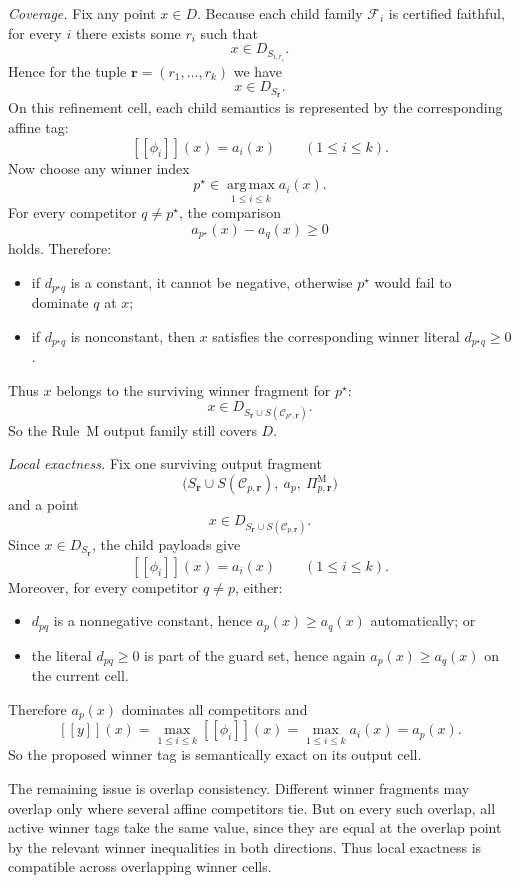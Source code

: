 \emph{Coverage.}
Fix any point $x\in D$. Because each child family $\mathcal F_i$ is certified faithful, for every $i$ there exists some $r_i$ such that
\[
 x\in D_{S_{i,r_i}}.
\]
Hence for the tuple $\mathbf r=(r_1,\dots,r_k)$ we have
\[
 x\in D_{S_{\mathbf r}}.
\]
On this refinement cell, each child semantics is represented by the corresponding affine tag:
\[
 [[\phi_i]](x)=a_i(x)
 \qquad (1\le i\le k).
\]
Now choose any winner index
\[
 p^\star\in \operatorname*{arg\,max}_{1\le i\le k} a_i(x).
\]
For every competitor $q\neq p^\star$, the comparison
\[
 a_{p^\star}(x)-a_q(x)\ge 0
\]
holds. Therefore:
\begin{itemize}
    \item if $d_{p^\star q}$ is a constant, it cannot be negative, otherwise $p^\star$ would fail to dominate $q$ at $x$;
    \item if $d_{p^\star q}$ is nonconstant, then $x$ satisfies the corresponding winner literal $d_{p^\star q}\ge 0$.
\end{itemize}
Thus $x$ belongs to the surviving winner fragment for $p^\star$:
\[
 x\in D_{S_{\mathbf r}\cup S(\mathcal C_{p^\star,\mathbf r})}.
\]
So the Rule~M output family still covers $D$.

\emph{Local exactness.}
Fix one surviving output fragment
\[
 \bigl(S_{\mathbf r}\cup S(\mathcal C_{p,\mathbf r}),\ a_p,\ \Pi_{p,\mathbf r}^{\mathrm M}\bigr)
\]
and a point
\[
 x\in D_{S_{\mathbf r}\cup S(\mathcal C_{p,\mathbf r})}.
\]
Since $x\in D_{S_{\mathbf r}}$, the child payloads give
\[
 [[\phi_i]](x)=a_i(x)
 \qquad (1\le i\le k).
\]
Moreover, for every competitor $q\neq p$, either:
\begin{itemize}
    \item $d_{pq}$ is a nonnegative constant, hence $a_p(x)\ge a_q(x)$ automatically; or
    \item the literal $d_{pq}\ge 0$ is part of the guard set, hence again $a_p(x)\ge a_q(x)$ on the current cell.
\end{itemize}
Therefore $a_p(x)$ dominates all competitors and
\[
 [[y]](x)=\max_{1\le i\le k}[[\phi_i]](x)=\max_{1\le i\le k} a_i(x)=a_p(x).
\]
So the proposed winner tag is semantically exact on its output cell.

The remaining issue is overlap consistency. Different winner fragments may overlap only where several affine competitors tie. But on every such overlap, all active winner tags take the same value, since they are equal at the overlap point by the relevant winner inequalities in both directions. Thus local exactness is compatible across overlapping winner cells.

